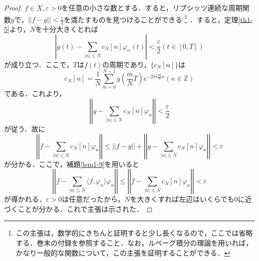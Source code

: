 \documentclass[a4j]{jsbook}
\numberwithin{theorem}{chapter}  %
\begin{document}
\begin{proof}
\(f\in X, \varepsilon>0\)を任意の小さな数とする．すると，リプシッツ連続な周期関数\(g\)で，\(\displaystyle ||f-g||<\frac{\varepsilon}{2}\)を満たすものを見つけることができる
\footnote{
この主張は，数学的にきちんと証明すると少し長くなるので，ここでは省略する．巻末の付録を参照すること．なお，ルベーグ積分の理論を用いれば，かなり一般的な関数について，この主張を証明することができる．
}
．すると，定理\ref{th1-5}より，\(N\)を十分大きくとれば
\begin{equation*}
    \left|g(t)-\sum_{|n|\leq N}c_N[n]\varphi_n(t)\right|<\frac{\varepsilon}{2} (t\in[0, T])
\end{equation*}
が成り立つ．ここで，\(T\)は\(f(t)\)の周期であり，\(\{c_N[n]\}\)は
\begin{equation*}
    c_N[n]=\frac{1}{N}\sum_{m=0}^{N-1}g\left(\frac{m}{N}T\right)e^{-2\pi i\frac{m}{N}n} (n\in\mathbb{Z})
\end{equation*}
である．これより，
\begin{equation*}
    \left|\left|g-\sum_{|n|\leq N}c_N[n]\varphi_n\right|\right|<\frac{\varepsilon}{2}
\end{equation*}
が従う．故に
\begin{equation*}
    \left|\left|f-\sum_{|n|\leq N} c_N[n]\varphi_n\right|\right|\leq||f-g||+\left|\left|g-\sum_{|n|\leq N} c_N[n]\varphi_n\right|\right|<\varepsilon
\end{equation*}
が分かる．ここで，補題\ref{lem1-9}を用いると
\begin{equation*}
    \left|\left|f-\sum_{|n|\leq N}\langle f, \varphi_n\rangle\varphi_n\right|\right|\leq\left|\left|f-\sum_{|n|\leq N}c_N[n]\varphi_n\right|\right|<\varepsilon
\end{equation*}
が導かれる．\(\varepsilon>0\)は任意だったから，\(N\)を大きくすれば左辺はいくらでも0に近づくことが分かる．これで主張は示された．
\end{proof}
\end{document}
